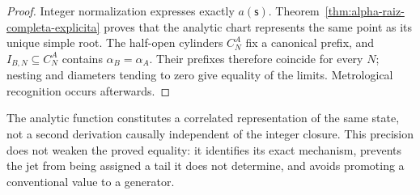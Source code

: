 \begin{proof}
Integer normalization expresses exactly \(a(\mathsf s)\).
Theorem~\ref{thm:alpha-raiz-completa-explicita} proves that the analytic
chart represents the same point as its unique simple root. The half-open
cylinders \(C_N^A\) fix a canonical prefix, and
\(I_{B,N}\subseteq C_N^A\) contains \(\alpha_B=\alpha_A\). Their prefixes
therefore coincide for every \(N\); nesting and diameters tending to zero
give equality of the limits. Metrological recognition occurs
afterwards.
\end{proof}

The analytic function constitutes a correlated representation of the same
state, not a second derivation causally independent of the integer closure.
This precision does not weaken the proved equality: it identifies its
exact mechanism, prevents the jet from being assigned a tail it does not
determine, and avoids promoting a conventional value to a generator.
